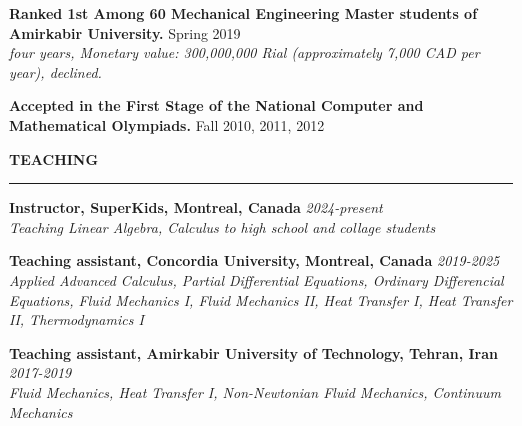 \documentclass[10pt]{article}
\begin{document}
			
	\noindent \textbf {\small Ranked 1st Among 60 Mechanical Engineering Master students of Amirkabir University.} \hfill {Spring 2019} 
		\\ \textit{four years, Monetary value: 300,000,000 Rial (approximately 7,000 CAD per year), declined.}
		
		
	\noindent \textbf {\small Accepted in the First Stage of the National Computer and Mathematical Olympiads.} \hfill {Fall 2010, 2011, 2012} 
		\vspace{1.5mm}
		
		
		
		\noindent \textbf{\color{violet}TEACHING}
		
		\vspace{-2mm}
		
		\noindent\rule[0.5ex]{\linewidth}{1pt}
		
		{\noindent  \bf Instructor, SuperKids, Montreal, Canada} \hfill {\em 2024-present} 
		\\ \textit{Teaching Linear Algebra, Calculus to high school and collage students}
		
		\vspace{1.5mm}
		
		{\noindent  \bf Teaching assistant, Concordia University, Montreal, Canada} \hfill {\em 2019-2025} 
		\\ \textit{Applied Advanced Calculus, Partial Differential Equations, Ordinary Differencial Equations, Fluid Mechanics I, Fluid Mechanics II, Heat Transfer I, Heat Transfer II, Thermodynamics I}
		
		\vspace{1.5mm}
		
		{\noindent  \bf Teaching assistant, Amirkabir University of Technology, Tehran, Iran} \hfill {\em 2017-2019} 
		\\ \textit{Fluid Mechanics, Heat Transfer I, Non-Newtonian Fluid Mechanics, Continuum Mechanics}
		
		
		
		
		
		
\end{document}
